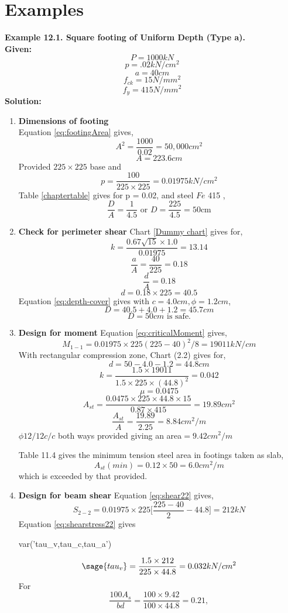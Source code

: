 \documentclass{report}
\newcommand{\equmacro}[1] {Equation #1}
\newcommand{\chartmacro}[1] {Chart #1}
\newcommand{\tablemacro}[1] {Table #1}
\newcommand{\Fefouronefivemacro}[1] {$Fe$ 415 #1}
\begin{document}
\section{Examples}
\textbf{ Example 12.1. Square footing of Uniform Depth (Type a).}\\
\textbf{ Given:}
$$P = 1000kN$$
$$p = .02 kN/cm^2$$
$$a = 40 cm$$
$$f_{ck} = 15 N/mm^2$$
$$f_y = 415 N/mm^2$$
\textbf{Solution:}
\begin{enumerate}
\item \textbf{Dimensions of footing}\\
        \equmacro \ref{eq:footingArea} gives,
        $$A^2=\frac{1000}{0.02}=50,000 cm^2$$
        $$A=223.6 cm$$
Provided $225 \times 225$ base and
        $$p = \frac{100}{225 \times 225} = 0.01975 kN/cm^2$$
        \tablemacro \ref{chaptertable} gives for p = 0.02, and steel \Fefouronefivemacro,
        $$\frac{D}{A} = \frac{1}{4.5} \text{ or } D = \frac{225}{4.5}=50 \text{cm}$$
\item   \textbf{Check for perimeter shear}
        \chartmacro \ref{Dummy chart} gives for,
        $$k=\frac{0.67\sqrt{15}\times 1.0}{0.01975}=13.14$$
        $$\frac{a}{A}=\frac{40}{225}=0.18$$
        $$\frac{d}{A} = 0.18$$
        $$d=0.18 \times 225 = 40.5$$
\equmacro \ref{eq:depth-cover} gives with $c = 4.0 cm,\phi=1.2cm$,   
        $$D=40.5+4.0+1.2=45.7 cm$$
        $$D = 50cm \text{ is safe.}$$
\item  \textbf{Design for moment}
\equmacro \ref{eq:criticalMoment} gives,
$$M_{1-1}=0.01975 \times225(225-40)^2/8=19011kN/cm$$
With rectangular compression zone, \chartmacro (2.2) gives for,
        $$d=50-4.0-1.2=44.8cm$$
        $$k=\frac{1.5\times19011}{1.5\times225\times(44.8)^2}=0.042$$
        $$\mu = 0.0475$$
        $$A_{st}=\frac{0.0475\times225\times44.8\times15}{0.87\times415}=19.89cm^2$$
        $$\frac{A_{st}}{A}=\frac{19.89}{2.25}=8.84cm^2/m $$
$\phi 12/12 c/c $ both ways provided giving an area$ = 9.42cm^2/m$

\tablemacro 11.4 gives the minimum tension steel area in footings taken as slab,
$$A_{st}(min)=0.12\times50=6.0cm^2/m$$
which is exceeded by that provided.
\item  \textbf{Design for beam shear}
        \equmacro \ref{eq:shear22} gives,
        $$S_{2-2}=0.01975\times225\bigg[\frac{225-40}{2}-44.8\bigg]=212kN$$
        \equmacro \ref{eq:shearstress22} gives
\begin{sagesilent}
       var('tau_v,tau_c,tau_a')
\end{sagesilent}
$$\sage{tau_v}=\frac{1.5\times212}{225\times44.8}=0.032kN/cm^2$$
For $$\frac{100A_{s}}{bd}=\frac{100\times9.42}{100\times44.8}=0.21,$$


\end{enumerate}
\end{document}
